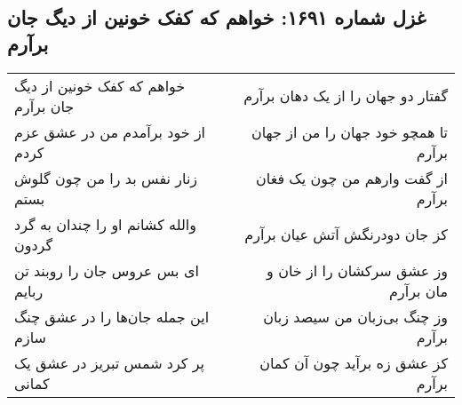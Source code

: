 \begin{center}
\section*{غزل شماره ۱۶۹۱: خواهم که کفک خونین از دیگ جان برآرم}
\label{sec:1691}
\begin{longtable}{l p{0.5cm} r}
خواهم که کفک خونین از دیگ جان برآرم
&&
گفتار دو جهان را از یک دهان برآرم
\\
از خود برآمدم من در عشق عزم کردم
&&
تا همچو خود جهان را من از جهان برآرم
\\
زنار نفس بد را من چون گلوش بستم
&&
از گفت وارهم من چون یک فغان برآرم
\\
والله کشانم او را چندان به گرد گردون
&&
کز جان دودرنگش آتش عیان برآرم
\\
ای بس عروس جان را روبند تن ربایم
&&
وز عشق سرکشان را از خان و مان برآرم
\\
این جمله جان‌ها را در عشق چنگ سازم
&&
وز چنگ بی‌زبان من سیصد زبان برآرم
\\
پر کرد شمس تبریز در عشق یک کمانی
&&
کز عشق زه برآید چون آن کمان برآرم
\\
\end{longtable}
\end{center}
